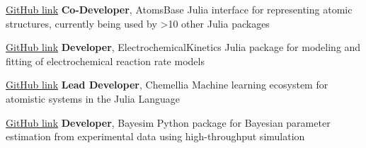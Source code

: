     {\href{https://github.com/https://github.com/JuliaMolSim/AtomsBase.jl}{GitHub link}}
    {\textbf{Co-Developer}, AtomsBase}
    {Julia interface for representing atomic structures, currently being used by >10 other Julia packages}

\vspace{-2mm}
    {\href{https://github.com/BattModels/ElectrochemicalKinetics.jl}{GitHub link}}
    {\textbf{Developer}, ElectrochemicalKinetics}
    {Julia package for modeling and fitting of electrochemical reaction rate models}

\vspace{-2mm}
    {\href{https://github.com/Chemellia}{GitHub link}}
    {\textbf{Lead Developer}, Chemellia}
    {Machine learning ecosystem for atomistic systems in the Julia Language}

\vspace{-2mm}
    {\href{https://github.com/PV-Lab/bayesim}{GitHub link}}
    {\textbf{Developer}, Bayesim}
    {Python package for Bayesian parameter estimation from experimental data using high-throughput simulation}